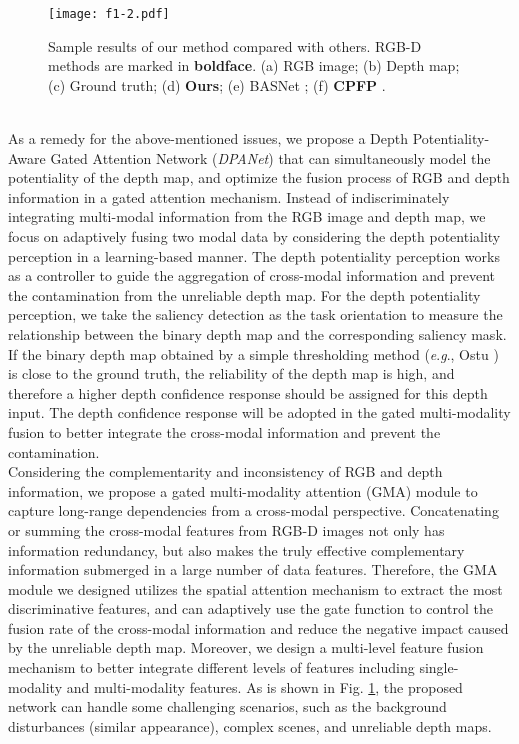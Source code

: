 \documentclass[journal]{IEEEtran}
\def\OURNET{\textit{DPANet}}
\newcommand{\eg}{\textit{e}.\textit{g}.}
\begin{document}
 \begin{figure}[t]
 	\centering
 	\texttt{[image: f1-2.pdf]}
 	\caption {Sample results of our method compared with others. RGB-D methods are marked in \textbf{boldface}.
 		(a) RGB image; (b) Depth map; (c) Ground truth; (d) \textbf{Ours}; (e) BASNet \cite{Qin_2019_CVPR}; (f) \textbf{CPFP} \cite{zhao2019contrast}.
 	}
 	\label{fig1}
 \end{figure}
\\
\indent As a remedy for the above-mentioned issues, we propose a Depth Potentiality-Aware Gated Attention Network (\OURNET) that can simultaneously model the potentiality of the depth map, and optimize the fusion process of RGB and depth information in a gated attention mechanism. Instead of indiscriminately integrating multi-modal information from the RGB image and depth map, we focus on adaptively fusing two modal data by considering the depth potentiality perception in a learning-based manner. The depth potentiality perception works as a controller to guide the aggregation of cross-modal information and prevent the contamination from the unreliable depth map. For the depth potentiality perception, we take the saliency detection as the task orientation to measure the relationship between the binary depth map and the corresponding saliency mask. If the binary depth map obtained by a simple thresholding method (\eg, Ostu \cite{otsu1979threshold}) is close to the ground truth, the reliability of the depth map is high, and therefore a higher depth confidence response should be assigned for this depth input.
The depth confidence response will be adopted in the gated multi-modality fusion to better integrate the cross-modal information and prevent the contamination. \\
\indent Considering the complementarity and inconsistency of RGB and depth information, we propose a gated multi-modality attention (GMA) module to capture long-range dependencies from a cross-modal perspective. Concatenating or summing the cross-modal features from RGB-D images not only has information redundancy, but also makes the truly effective complementary information submerged in  a large number of data features. Therefore, the GMA module we designed utilizes the spatial attention mechanism to extract the most discriminative features, and can adaptively use the gate function to control the fusion rate of the cross-modal information and reduce the negative impact caused by the unreliable depth map. Moreover, we design a multi-level feature fusion mechanism to better integrate different levels of features including single-modality and multi-modality features. As is shown in Fig. \ref{fig1}, the proposed network can handle some challenging scenarios, such as the background disturbances (similar appearance), complex scenes, and unreliable depth maps. \\
\end{document}
